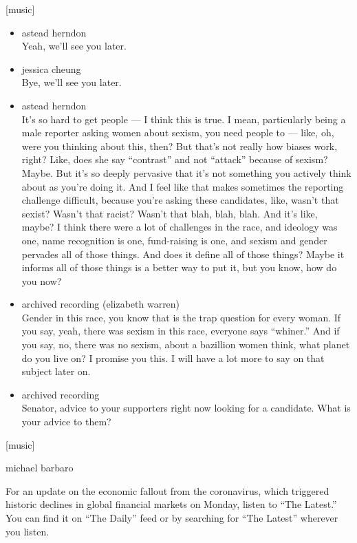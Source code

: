 {[}music{]}

\begin{itemize}
\item
  astead herndon\\
  Yeah, we'll see you later.
\item
  jessica cheung\\
  Bye, we'll see you later.
\item
  astead herndon\\
  It's so hard to get people --- I think this is true. I mean,
  particularly being a male reporter asking women about sexism, you need
  people to --- like, oh, were you thinking about this, then? But that's
  not really how biases work, right? Like, does she say ``contrast'' and
  not ``attack'' because of sexism? Maybe. But it's so deeply pervasive
  that it's not something you actively think about as you're doing it.
  And I feel like that makes sometimes the reporting challenge
  difficult, because you're asking these candidates, like, wasn't that
  sexist? Wasn't that racist? Wasn't that blah, blah, blah. And it's
  like, maybe? I think there were a lot of challenges in the race, and
  ideology was one, name recognition is one, fund-raising is one, and
  sexism and gender pervades all of those things. And does it define all
  of those things? Maybe it informs all of those things is a better way
  to put it, but you know, how do you now?
\item
  archived recording (elizabeth warren)\\
  Gender in this race, you know that is the trap question for every
  woman. If you say, yeah, there was sexism in this race, everyone says
  ``whiner.'' And if you say, no, there was no sexism, about a bazillion
  women think, what planet do you live on? I promise you this. I will
  have a lot more to say on that subject later on.
\item
  archived recording\\
  Senator, advice to your supporters right now looking for a candidate.
  What is your advice to them?
\end{itemize}

{[}music{]}

michael barbaro

For an update on the economic fallout from the coronavirus, which
triggered historic declines in global financial markets on Monday,
listen to ``The Latest.'' You can find it on ``The Daily'' feed or by
searching for ``The Latest'' wherever you listen.

